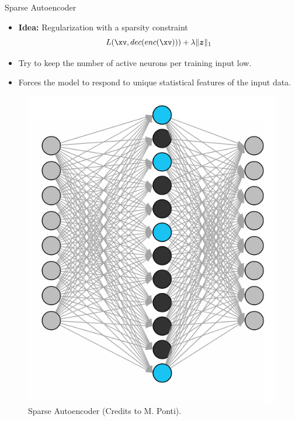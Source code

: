 \begin{vbframe}{Sparse Autoencoder}

\begin{itemize}
  \item \textbf{Idea:} Regularization with a sparsity constraint
  $$
    L(\xv, dec(enc(\xv))) + \lambda \|\bm{z}\|_1 
  $$
\item Try to keep the number of active neurons per training input low. 
\item Forces the model to respond to unique statistical features of the input data. 
\end{itemize}

\vspace*{-0.3cm}

\begin{figure}[h]
    \centering
    \includegraphics[width=0.25\linewidth]{plots/AE_sparse.png}
    \caption{Sparse Autoencoder (Credits to M. Ponti).} 
\end{figure}

\end{vbframe}


